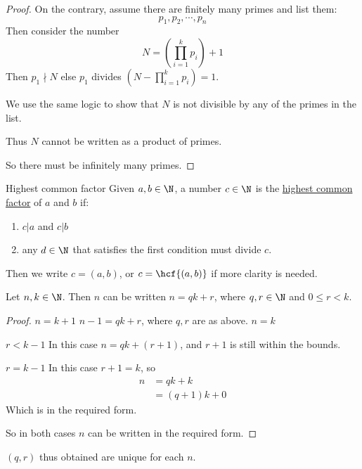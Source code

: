\documentclass[../Main.tex]{subfiles}
\begin{document}
\begin{proof}
    On the contrary, assume there are finitely many primes and list them:
    \begin{equation*}
        p_1, p_2, \cdots, p_n
    \end{equation*}
    Then consider the number 
    \begin{equation*}
        N = \left(\prod_{i=1}^{k} p_i\right) + 1
    \end{equation*}
    Then $p_1 \nmid N$ else $p_1$ divides $\left(N - \prod_{i=1}^{k}p_i\right) = 1$.\par
    We use the same logic to show that $N$ is not divisible by any of the primes in the list.\par
    Thus $N$ cannot be written as a product of primes. \contradiction\par
    So there must be infinitely many primes.
\end{proof}
\begin{definition}{Highest common factor}
    \label{defHCF}
    Given $a, b \in \N$, a number $c \in \N$ is the \underline{highest common factor} of $a$ and $b$ if:
    \begin{enumerate}
        \item $c | a$ and $c | b$
        \item any $d \in \N$ that satisfies the first condition must divide $c$.
    \end{enumerate}
\end{definition}
Then we write $c = (a, b)$, or $c = \hcf{(a, b)}$ if more clarity is needed.
\begin{proposition}
    Let $n, k \in \N$. Then $n$ can be written $n = qk + r$, where $q, r \in \N$ and $0 \leq r < k$.
\end{proposition}
\begin{proof}
    {$n = k + 1$}{
        $n - 1 = qk + r$, where $q, r$ are as above.
    }
    {$n = k$}{
        \begin{case}{$r < k - 1$}
            In this case $n = qk + (r + 1)$, and $r+1$ is still within the bounds.
        \end{case}
        \begin{case}{$r = k - 1$}
            In this case $r + 1 = k$, so
            \begin{align*}
                n &= qk + k \\
                &= (q + 1)k + 0
            \end{align*}
            Which is in the required form.
        \end{case}
        So in both cases $n$ can be written in the required form.
    }
\end{proof}
\begin{remark}
    $(q, r)$ thus obtained are unique for each $n$.
\end{remark}
\end{document}
